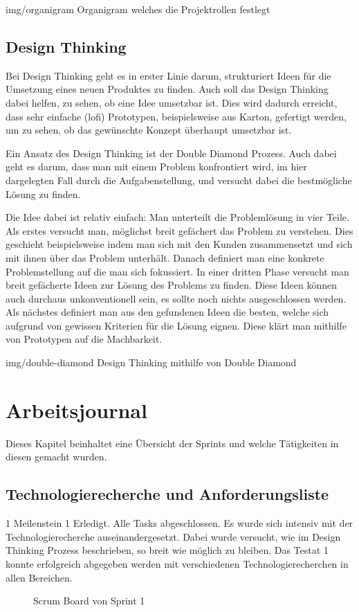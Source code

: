 \image
  {img/organigram}
  {Organigram welches die Projektrollen festlegt}

\subsection{Design Thinking}
\label{sec:design-thinking}

Bei Design Thinking \cite{Wikipedia-Design-Thinking} geht es in erster Linie darum, strukturiert 
Ideen für die Umsetzung eines neuen Produktes zu finden. Auch soll das Design Thinking
dabei helfen, zu sehen, ob eine Idee umsetzbar ist. Dies wird dadurch erreicht,
dass sehr einfache (\acrshort{lofi}) Prototypen, beispielsweise aus Karton, 
gefertigt werden, um zu sehen, ob das gewünschte Konzept überhaupt umsetzbar ist.

Ein Ansatz des Design Thinking ist der Double Diamond Prozess. Auch dabei geht es
darum, dass man mit einem Problem konfrontiert wird, im hier dargelegten Fall durch die 
Aufgabenstellung, und versucht dabei die bestmögliche Lösung zu finden.

Die Idee dabei ist relativ einfach: Man unterteilt die Problemlösung in vier Teile.
Als erstes versucht man, möglichst breit gefächert das Problem zu verstehen. Dies geschieht
beispielsweise indem man sich mit den Kunden zusammensetzt und sich mit ihnen über das Problem unterhält.
Danach definiert man eine konkrete Problemstellung auf die man sich fokussiert.
In einer dritten Phase versucht man breit gefächerte Ideen zur Lösung des Problems zu finden.
Diese Ideen können auch durchaus unkonventionell sein, es sollte noch nichts ausgeschlossen werden.
Als nächstes definiert man aus den gefundenen Ideen
die besten, welche sich aufgrund von gewissen Kriterien für die Lösung eignen.
Diese klärt man mithilfe von Prototypen auf die Machbarkeit.

\image
  {img/double-diamond}
  {Design Thinking mithilfe von Double Diamond}

\section{Arbeitsjournal}

Dieses Kapitel beinhaltet eine Übersicht der Sprints und welche Tätigkeiten 
in diesen gemacht wurden.

\subsection*{Technologierecherche und Anforderungsliste}
\workday
    {1}
    {\ok Meilenstein 1 Erledigt. Alle Tasks abgeschlossen.}
    {
      Es wurde sich intensiv mit der Technologierecherche auseinandergesetzt.
      Dabei wurde versucht, wie im Design Thinking Prozess beschrieben, so breit wie möglich
      zu bleiben.
    }
    {
      Das Testat 1 konnte erfolgreich abgegeben werden mit verschiedenen Technologierecherchen in
      allen Bereichen.
    }
    \begin{figure}[H]
        \caption{Scrum Board von Sprint 1}
    \end{figure}

